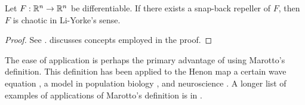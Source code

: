 \documentclass[10pt,draft,twoside]{book}
\begin{document}
\begin{theorem}
  \citep{marotto1,marotto2}
  Let $F: \mathbb{R}^n \to \mathbb{R}^n$ be differentiable.
  If there exists a snap-back repeller of $F$, then $F$ is chaotic in Li-Yorke's sense.
  \label{thm:sbrepeller}
  \begin{proof}
    See \citet[Theorem 3.1]{marotto1}.
    \citet{martellibook} discusses concepts employed in the proof.
  \end{proof}
\end{theorem}
The ease of application is perhaps the primary advantage of using Marotto's definition.
This definition has been applied to the Henon map \citep{marotto1} a certain wave equation \citep{marottoapp1}, a model in population biology \citep{marottoapp2}, and neuroscience \citep{marottoapp3}.
A longer list of examples of applications of Marotto's definition is in \citet{marotto2}.
\end{document}
